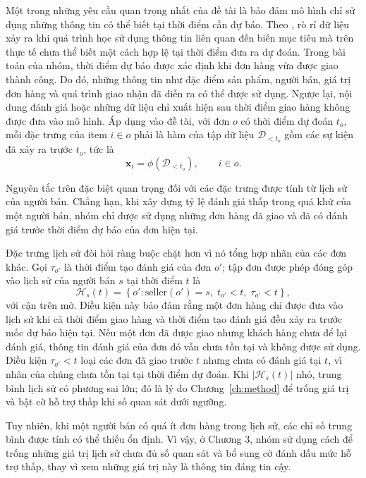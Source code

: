 \documentclass[12pt,a4paper]{report}
\begin{document}
Một trong những yêu cầu quan trọng nhất của đề tài là bảo đảm mô hình chỉ sử dụng những thông tin có thể biết tại thời điểm cần dự báo. Theo \textcite{kaufman2012}, rò rỉ dữ liệu xảy ra khi quá trình học sử dụng thông tin liên quan đến biến mục tiêu mà trên thực tế chưa thể biết một cách hợp lệ tại thời điểm đưa ra dự đoán.
Trong bài toán của nhóm, thời điểm dự báo được xác định khi đơn hàng vừa được giao thành công. Do đó, những thông tin như đặc điểm sản phẩm, người bán, giá trị đơn hàng và quá trình giao nhận đã diễn ra có thể được sử dụng. Ngược lại, nội dung đánh giá hoặc những dữ liệu chỉ xuất hiện sau thời điểm giao hàng không được đưa vào mô hình. Áp dụng vào đề tài, với đơn $o$ có thời điểm dự đoán $t_o$, mỗi đặc trưng của item $i \in o$ phải là hàm của tập dữ liệu $\mathcal{D}_{<t_o}$ gồm các sự kiện đã xảy ra trước $t_o$, tức là
\begin{equation}\label{eq:th-pit}
  \mathbf{x}_i = \phi\left(\mathcal{D}_{<t_o}\right), \qquad i \in o .
\end{equation}

Nguyên tắc trên đặc biệt quan trọng đối với các đặc trưng được tính từ lịch sử của người bán. Chẳng hạn, khi xây dựng tỷ lệ đánh giá thấp trong quá khứ của một người bán, nhóm chỉ được sử dụng những đơn hàng đã giao và đã có đánh giá trước thời điểm dự báo của đơn hiện tại.

Đặc trưng lịch sử đòi hỏi ràng buộc chặt hơn vì nó tổng hợp nhãn của các đơn khác. Gọi $\tau_{o'}$ là thời điểm tạo đánh giá của đơn $o'$; tập đơn được phép đóng góp vào lịch sử của người bán $s$ tại thời điểm $t$ là
\begin{equation}\label{eq:th-history}
  \mathcal{H}_s(t) = \left\{ o' : \mathrm{seller}(o') = s,\; t_{o'} < t,\; \tau_{o'} < t \right\},
\end{equation}
với cận trên mở. Điều kiện này bảo đảm rằng một đơn hàng chỉ được đưa vào lịch sử khi cả thời điểm giao hàng và thời điểm tạo đánh giá đều xảy ra trước mốc dự báo hiện tại. Nếu một đơn đã được giao nhưng khách hàng chưa để lại đánh giá, thông tin đánh giá của đơn đó vẫn chưa tồn tại và không được sử dụng. Điều kiện $\tau_{o'} < t$ loại các đơn đã giao trước $t$ nhưng chưa có đánh giá tại $t$, vì nhãn của chúng chưa tồn tại tại thời điểm dự đoán. Khi $|\mathcal{H}_s(t)|$ nhỏ, trung bình lịch sử có phương sai lớn; đó là lý do Chương~\ref{ch:method} để trống giá trị và bật cờ hỗ trợ thấp khi số quan sát dưới ngưỡng.

Tuy nhiên, khi một người bán có quá ít đơn hàng trong lịch sử, các chỉ số trung bình được tính có thể thiếu ổn định. Vì vậy, ở Chương 3, nhóm sử dụng cách để trống những giá trị lịch sử chưa đủ số quan sát và bổ sung cờ đánh dấu mức hỗ trợ thấp, thay vì xem những giá trị này là thông tin đáng tin cậy.
\end{document}
